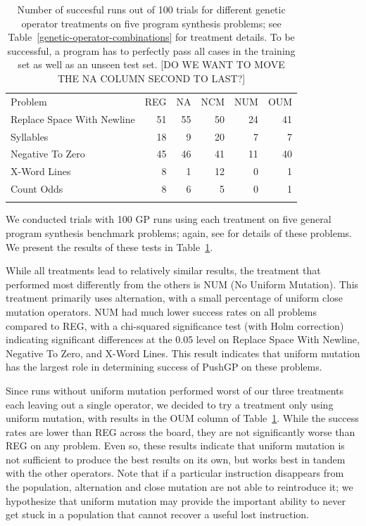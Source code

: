 \documentclass[graybox]{svmult}
\begin{document}
\begin{table}[t]
\centering
\label{genetic-operator-results}
\caption{Number of succesful runs out of 100 trials for different genetic operator treatments on five program synthesis problems; see Table~\ref{genetic-operator-combinations} for treatment details. To be successful, a program has to perfectly pass all cases in the training set as well as an unseen test set. [DO WE WANT TO MOVE THE NA COLUMN SECOND TO LAST?]}
\begin{tabular}{l r r r r r}
\hline\noalign{\smallskip}
Problem                    & REG & NA & NCM & NUM & OUM \\
\noalign{\smallskip}\svhline\noalign{\smallskip}
Replace Space With Newline &  51 & 55 &  50 &  24 &  41 \\
Syllables                  &  18 &  9 &  20 &   7 &   7 \\
Negative To Zero           &  45 & 46 &  41 &  11 &  40 \\
X-Word Lines               &   8 &  1 &  12 &   0 &   1 \\
Count Odds                 &   8 &  6 &   5 &   0 &   1 \\
\noalign{\smallskip}\hline\noalign{\smallskip}
\end{tabular}
\end{table}

We conducted trials with 100 GP runs using each treatment on five general program synthesis benchmark problems; again, see \cite{Helmuth:2015:GECCO} for details of these problems. We present the results of these tests in Table~\ref{genetic-operator-results}.

While all treatments lead to relatively similar results, the treatment that performed most differently from the others is NUM (No Uniform Mutation). This treatment primarily uses alternation, with a small percentage of uniform close mutation operators. NUM had much lower success rates on all problems compared to REG, with a chi-squared significance test (with Holm correction) indicating significant differences at the 0.05 level on Replace Space With Newline, Negative To Zero, and X-Word Lines. This result indicates that uniform mutation has the largest role in determining success of PushGP on these problems.

Since runs without uniform mutation performed worst of our three treatments each leaving out a single operator, we decided to try a treatment only using uniform mutation, with results in the OUM column of Table~\ref{genetic-operator-results}. While the success rates are lower than REG across the board, they are not significantly worse than REG on any problem. Even so, these results indicate that uniform mutation is not sufficient to produce the best results on its own, but works best in tandem with the other operators. Note that if a particular instruction disappears from the population, alternation and close mutation are not able to reintroduce it; we hypothesize that uniform mutation may provide the important ability to never get stuck in a population that cannot recover a useful lost instruction.
\end{document}
